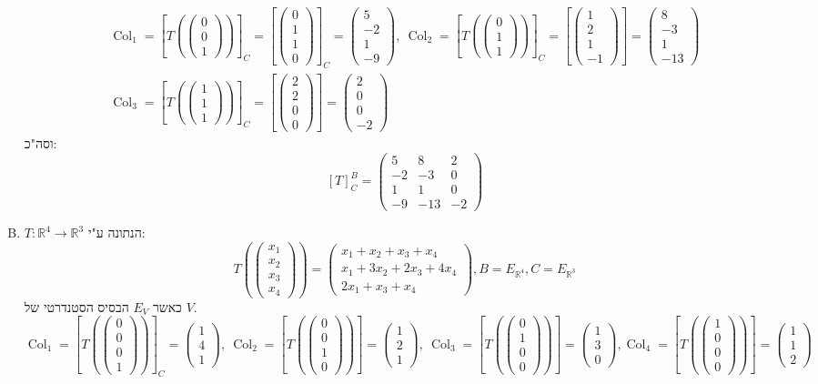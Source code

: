 \documentclass[]{article}
\newcommand\R     {\mathbb{R}}
\DeclareMathOperator\col   {Col}
\newcommand\co        {\colon}
\newcommand\pms[1]    {\begin{pmatrix}
		#1
\end{pmatrix}}
\newcommand\cl [1]    {\left ( #1 \right )}
\newcommand\csb[1]    {\left [ #1 \right ]}
\begin{document}
\begin{enumerate}[A)]
\begin{gather*}
			\col_1 = \csb{T\cl{\pms{0 \\ 0 \\ 1}}}_C = \csb{\pms{0 \\ 1 \\ 1 \\ 0}}_C = \pms{5 \\ -2 \\ 1 \\ -9}, \ \col_2 = \csb{T\cl{\pms{0 \\ 1 \\ 1}}}_C = \csb{\pms{1 \\ 2 \\ 1 \\ -1}} = \pms{8 \\ -3 \\ 1 \\ -13} \\ \col_3 = \csb{T\cl{\pms{1 \\ 1 \\ 1}}}_C = \csb{\pms{2 \\ 2 \\ 0 \\ 0}} = \pms{2 \\ 0 \\ 0 \\ -2}
		\end{gather*}
		וסה"כ: 
		\[ [T]_C^B = \pms{5 & 8 & 2 \\ -2 & -3 & 0 \\ 1 & 1 & 0 \\ -9 & -13 & -2} \]
		\item $T \co \R^4 \to \R^3$ הנתונה ע"י: 
		\[ T\cl{\pms{x_1 \\ x_2 \\ x_3 \\ x_4}} = \pms{x_1 + x_2 + x_3 + x_4 \\ x_1 + 3x_2 + 2x_3 + 4x_4 \\ 2x_1 + x_3 + x_4}, B = E_{\R^4}, C = E_{\R^3} \]
		כאשר $E_V$ הבסיס הסטנדרטי של $V$. 
		\[ \col_1 = \csb{T\cl{\pms{0 \\ 0 \\ 0 \\ 1}}}_C = \pms{1 \\ 4 \\ 1}, \ \col_2 = \csb{T\cl{\pms{0 \\ 0 \\ 1 \\ 0}}} = \pms{1 \\ 2 \\ 1}, \ \col_3 = \csb{T\cl{\pms{0 \\ 1 \\ 0 \\ 0}}} = \pms{1 \\ 3 \\ 0}, \col_4 = \csb{T\cl{\pms{1 \\ 0 \\ 0 \\ 0}}} = \pms{1 \\ 1 \\ 2} \]

\end{enumerate}
\end{document}
